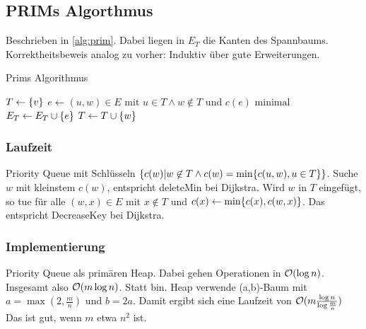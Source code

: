             
    \subsection{PRIMs Algorthmus}
        Beschrieben in \autoref{alg:prim}. Dabei liegen in $E_T$ die Kanten des Spannbaums. Korrektheitsbeweis analog zu vorher: Induktiv über gute Erweiterungen.
    	\begin{algorithm}
        		\caption{Prims Algorithmus}
        		\label{alg:prim}
        		\begin{algorithmic}[1]
        			    \State $T \gets \{v\}$
        				    \State $e \gets (u,w) \in E \text{ mit } u \in T \land w \not \in T \text{ und } c(e) \text{ minimal}$
        				    \State $E_T \gets E_T \cup \{e\}$
        				    \State $T \gets T \cup \{w\}$
        				\EndWhile
        			\EndFunction
        		\end{algorithmic}
        	\end{algorithm}
        
        
        \subsubsection{Laufzeit}
            Priority Queue mit Schlüsseln $\{c(w) | w \not \in T \land c(w) = \min\{c(u,w),u \in T\}\}$. Suche $w$ mit kleinstem $c(w)$, entspricht deleteMin bei Dijkstra. Wird $w$ in $T$ eingefügt, so tue für alle $(w,x) \in E$ mit $x \not \in T$ und $c(x) \leftarrow \min \{c(x), c(w,x)\}$. Das entspricht DecreaseKey bei Dijkstra. 
            
        \subsubsection{Implementierung}
            Priority Queue als primären Heap. Dabei gehen Operationen in $\mathcal{O}(\log n)$. Insgesamt also $\mathcal{O}(m \log n)$. Statt bin. Heap verwende (a,b)-Baum mit $ a = \max(2,\frac{m}{n})$ und $b=2a$. Damit ergibt sich eine Laufzeit von $\mathcal{O}(m \frac{\log n}{\log \frac{m}{n}})$ Das ist gut, wenn $m$ etwa $n^2$ ist.
            
    
        

